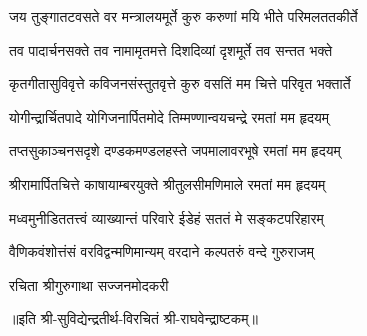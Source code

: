 
\twolineshloka
{जय तुङ्गातटवसते वर मन्त्रालयमूर्ते}
{कुरु करुणां मयि भीते परिमलततकीर्ते}

\twolineshloka
{तव पादार्चनसक्ते तव नामामृतमत्ते}
{दिशदिव्यां दृशमूर्ते तव सन्तत भक्ते}

\twolineshloka
{कृतगीतासुविवृत्ते कविजनसंस्तुतवृत्ते}
{कुरु वसतिं मम चित्ते परिवृत भक्तार्ते}

\twolineshloka
{योगीन्द्रार्चितपादे योगिजनार्पितमोदे}
{तिम्मण्णान्वयचन्द्रे रमतां मम हृदयम्}

\twolineshloka
{तप्तसुकाञ्चनसदृशे दण्डकमण्डलहस्ते}
{जपमालावरभूषे रमतां मम हृदयम्}

\twolineshloka
{श्रीरामार्पितचित्ते काषायाम्बरयुक्ते}
{श्रीतुलसीमणिमाले रमतां मम हृदयम्}

\twolineshloka
{मध्वमुनीडिततत्त्वं व्याख्यान्तं परिवारे}
{ईडेहं सततं मे सङ्कटपरिहारम्}

\twolineshloka
{वैणिकवंशोत्तंसं वरविद्वन्मणिमान्यम्}
{वरदाने कल्पतरुं वन्दे गुरुराजम्}

{रचिता श्रीगुरुगाथा सज्जनमोदकरी}

॥इति श्री-सुविद्येन्द्रतीर्थ-विरचितं श्री-राघवेन्द्राष्टकम्॥
